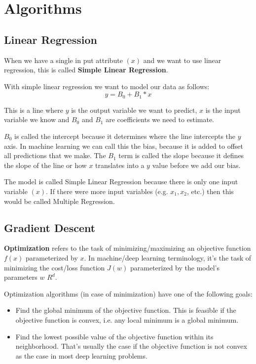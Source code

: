 \pagebreak

\section{Algorithms}

\subsection{Linear Regression}

When we have a single in put attribute $(x)$ and we want to use linear regression, this is called \textbf{Simple Linear Regression}.

With simple linear regression we want to model our data as follows:
\[
    y = B_{0} + B_{1} * x
\]

This is a line where $y$ is the output variable we want to predict, $x$ is the input variable we know and $B_{0}$ and $B_{1}$ are coefficients we need to estimate.

$B_{0}$ is called the intercept because it determines where the line intercepts the $y$ axis. In machine learning we can call this the bias, because it is added to offset all predictions that we make. The $B_{1}$ term is called the slope because it defines the slope of the line or how $x$ translates into a $y$ value before we add our bias.

The model is called Simple Linear Regression because there is only one input variable $(x)$. If there were more input variables (e.g. $x_{1}, x_{2}$, etc.) then this would be called Multiple Regression.

\pagebreak

\subsection{Gradient Descent}

\textbf{Optimization} refers to the task of minimizing/maximizing an objective function $f(x)$ parameterized by $x$. In machine/deep learning terminology, it’s the task of minimizing the cost/loss function $J(w)$ parameterized by the model’s parameters $w$ \epsilon $R^d$.

Optimization algorithms (in case of minimization) have one of the following goals:
\begin{itemize}
    \item Find the global minimum of the objective function. This is feasible if the objective function is convex, i.e. any local minimum is a global minimum.
    \item Find the lowest possible value of the objective function within its neighborhood. That’s usually the case if the objective function is not convex as the case in most deep learning problems.
\end{itemize}

